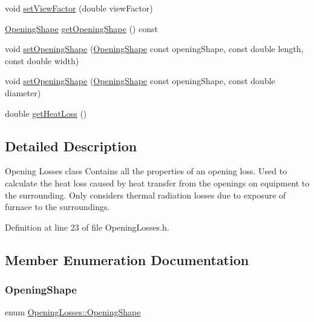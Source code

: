 \begin{DoxyCompactItemize}
\item 
void \hyperlink{class_opening_losses_a4e6c6f1549e01cd4b82b7505e403d643}{set\+View\+Factor} (double view\+Factor)
\item 
\hyperlink{class_opening_losses_a57f9759b6fd72a1b75aa885800e26157}{Opening\+Shape} \hyperlink{class_opening_losses_a5046cd699178e4edca774d0d0da7965a}{get\+Opening\+Shape} () const
\item 
void \hyperlink{class_opening_losses_a19c28e02d1e736d74b3c82047d4d23b2}{set\+Opening\+Shape} (\hyperlink{class_opening_losses_a57f9759b6fd72a1b75aa885800e26157}{Opening\+Shape} const opening\+Shape, const double length, const double width)
\item 
void \hyperlink{class_opening_losses_afb0e0884b0e60db8cb6674228cf3aafe}{set\+Opening\+Shape} (\hyperlink{class_opening_losses_a57f9759b6fd72a1b75aa885800e26157}{Opening\+Shape} const opening\+Shape, const double diameter)
\item 
double \hyperlink{class_opening_losses_a38112eb408f72e252b42a68a41a25d0f}{get\+Heat\+Loss} ()
\end{DoxyCompactItemize}


\subsection{Detailed Description}
Opening Losses class Contains all the properties of an opening loss. Used to calculate the heat loss caused by heat transfer from the openings on equipment to the surrounding. Only considers thermal radiation losses due to exposure of furnace to the surroundings. 

Definition at line 23 of file Opening\+Losses.\+h.



\subsection{Member Enumeration Documentation}
\mbox{\label{class_opening_losses_a57f9759b6fd72a1b75aa885800e26157}} 
\subsubsection{\texorpdfstring{Opening\+Shape}{OpeningShape}\hspace{0.1cm}{\footnotesize\ttfamily [1/3]}}
{\footnotesize\ttfamily enum \hyperlink{class_opening_losses_a57f9759b6fd72a1b75aa885800e26157}{Opening\+Losses\+::\+Opening\+Shape}\hspace{0.3cm}{\ttfamily [strong]}}


